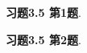 \renewcommand{\newpageorvspace}{\vspace{2em}}

\date{第八次作业}



\maketitle

{\bf 习题3.5 第1题}.

\newpageorvspace

{\bf 习题3.5 第2题}.



